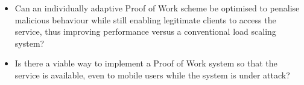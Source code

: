 \begin{itemize}
\item Can an individually adaptive Proof of Work scheme be optimised to penalise malicious behaviour while still enabling legitimate clients to access the service, thus improving performance versus a conventional load scaling system?

\item Is there a viable way to implement a Proof of Work system so that the service is available, even to mobile users while the system is under attack?

\end{itemize}

\begin{comment}
With the problem defined the question at hand is thus if it is possible to develop a Proof of Work protocol that is independent of client characteristics.
\begin{itemize}
\item Is there a viable way to implement a Proof of Work system so that the system's resources are accessable by a diverse variety of devices?

\item How should the protocol be optimised for low impact on legitimate client behaviour and high impact on malicious behaviour?

\item What advantages and disadvantages does proof of work concept bring in practice and in which applications could it be an improvement to current security?
\end{itemize}
\end{comment}